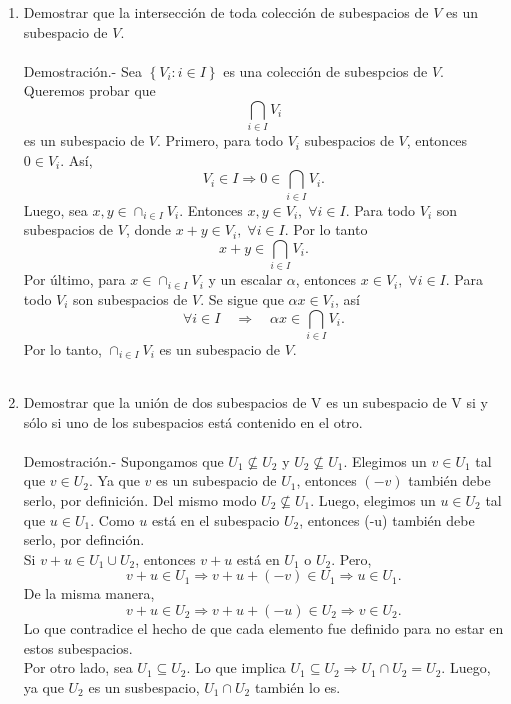 \begin{enumerate}[\bfseries 1.]
    \item Demostrar que la intersección de toda colección de subespacios de $V$ es un subespacio de $V$.\\\\
	Demostración.-\;  Sea $\left\{V_i : i\in I\right\}$ es una colección de subespcios de $V$. Queremos probar que 
	$$\bigcap_{i\in I} V_i$$
	es un subespacio de $V$. Primero, para todo $V_i$ subespacios de $V$, entonces $0\in V_i$. Así, 
	$$V_i\in I \Rightarrow 0\in \bigcap_{i\in I}V_i.$$
	Luego, sea $x,y\in \cap_{i\in I}V_i$. Entonces $x,y\in V_i, \; \forall i\in I$. Para todo $V_i$ son subespacios de $V$, donde $x+y\in V_i,\; \forall i\in I$. Por lo tanto 
	$$x+y\in \bigcap_{i\in I} V_i.$$
	Por último, para $x\in \cap_{i\in I}V_i$ y un escalar $\alpha$, entonces $x\in V_i,\; \forall i \in I$. Para todo $V_i$ son subespacios de $V$. Se sigue que $\alpha x\in V_i$, así 
	$$\forall i \in I \quad \Rightarrow \quad \alpha x \in \bigcap_{i\in I} V_i.$$
	Por lo tanto, $\cap_{i\in I} V_i$ es un subespacio de $V$.\\\\

    \item Demostrar que la unión de dos subespacios de V es un subespacio de V si y sólo si uno de los subespacios está contenido en el otro.\\\\
	Demostración.-\; Supongamos que $U_1\not\subseteq U_2$ y $U_2 \not\subseteq U_1$. Elegimos un $v\in U_1$ tal que $v\in U_2$. Ya que $v$ es un subespacio de $U_1$, entonces $(-v)$ también debe serlo, por definición. Del mismo modo $U_2\not\subseteq U_1$. Luego, elegimos un $u\in U_2$ tal que $u\in U_1$. Como $u$ está en el subespacio $U_2$, entonces (-u) también debe serlo, por definción.\\
	Si $v+u\in U_1\cup U_2$, entonces $v+u$ está en $U_1$ o $U_2$. Pero, 
	$$v+u\in U_1 \Rightarrow v+u+(-v)\in U_1\Rightarrow u\in U_1.$$
	De la misma manera,
	$$v+u\in U_2 \Rightarrow v+u+(-u)\in U_2\Rightarrow v\in U_2.$$
	Lo que contradice el hecho de que cada elemento fue definido para no estar en estos subespacios.\\
	Por otro lado, sea $U_1\subseteq U_2$. Lo que implica $U_1\subseteq U_2\Rightarrow U_1\cap U_2 = U_2.$ Luego, ya que $U_2$ es un susbespacio, $U_1\cap U_2$ también lo es.\\\\


\end{enumerate}
